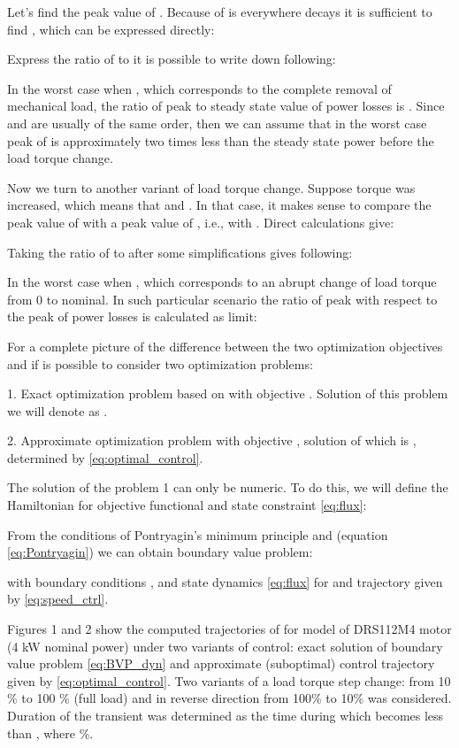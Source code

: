\documentclass[journal]{IEEEtran}
\begin{document}
Let's find the peak value of . Because of  is everywhere decays it is sufficient to find , which can be expressed directly:



Express the ratio of  to  it is possible to write down following:



In the worst case when , which corresponds to the complete removal of mechanical load, the ratio of  peak to steady state value of power losses is . Since  and  are usually of the same order, then we can assume that in the worst case peak of  is approximately two times less than the steady state power before the load torque change.

Now we turn to another variant of load torque change. Suppose torque was increased, which means that  and . In that case, it makes sense to compare the peak value of  with a peak value of , i.e.,  with . Direct calculations give:



Taking the ratio of  to  after some simplifications gives following:



In the worst case when , which corresponds to an abrupt change of load torque from 0 to nominal. In such particular scenario the ratio of  peak with respect to the peak of power losses is calculated as limit:



For a complete picture of the difference between the two optimization objectives  and  if is possible to consider two optimization problems:

1. Exact optimization problem based on  with objective . Solution of this problem we will denote as .

2. Approximate optimization problem with objective , solution of which is , determined by \eqref{eq:optimal_control}.

The solution of the problem 1 can only be numeric. To do this, we will define the Hamiltonian for objective functional  and state constraint \eqref{eq:flux}:



From the conditions of Pontryagin's minimum principle  and  (equation \eqref{eq:Pontryagin}) we can obtain boundary value problem:



with boundary conditions ,  and state dynamics \eqref{eq:flux} for  and trajectory  given by \eqref{eq:speed_ctrl}.

Figures 1 and 2 show the computed trajectories of  for model of DRS112M4 motor (4 kW nominal power) under two variants of  control: exact solution  of boundary value problem \eqref{eq:BVP_dyn} and approximate (suboptimal) control trajectory  given by \eqref{eq:optimal_control}. Two variants of a load torque step change: from 10 \% to 100 \% (full load) and in reverse direction from 100\% to 10\% was considered. Duration of the transient  was determined as the time during which  becomes less than , where  \%.
\end{document}
